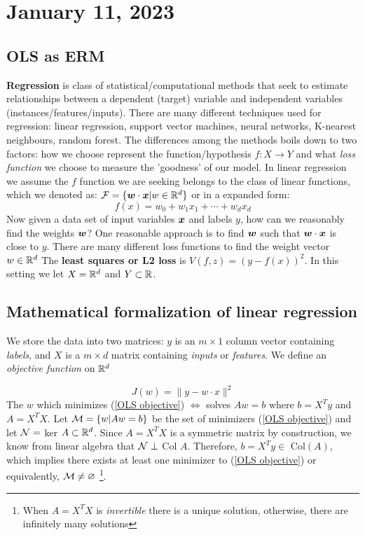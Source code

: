 \section{January 11, 2023}
\subsection{OLS as ERM}
\textbf{Regression} is class of statistical/computational methods that seek to estimate relationships between a dependent (target) variable and independent variables (instances/features/inputs).
There are many different techniques used for regression: linear regression, support vector machines, neural networks, K-nearest neighbours, random forest.
The differences among the methods boils down to two factors: how we choose represent the function/hypothesis $f: X \to Y$ and what \textit{loss function} we choose to measure the 'goodness' of our model. 
In linear regression we assume the $f$ function we are seeking belongs to the class of linear functions, which we denoted as:  $\mathcal F = \{\boldsymbol{w} \cdot \boldsymbol{x} | w \in \mathbb R^d \}$ or in a expanded form:
$$
f(x) = w_0 + w_1 x_1 + \cdots + w_d x_d
$$
Now given a data set of input variables $\boldsymbol{x}$ and labels $y$, how can we reasonably find the weights $\boldsymbol{w}$? One reasonable approach is to find $\boldsymbol{w}$ such that $\boldsymbol{w} \cdot \boldsymbol{x}$ is close to $y$.
There are many different loss functions to find the weight vector $w \in \mathbb R^d$
The \textbf{least squares or L2 loss} is $V(f,z) = (y - f(x))^2$. In this setting  we let $X = \mathbb R^d$ and $Y \subset \mathbb R$. 
\subsection{Mathematical formalization of linear regression}
We store the data into two matrices: $y$ is an $m \times 1$ column vector containing \textit{labels}, and $X$ is a $m \times d$ matrix containing \textit{inputs} or \textit{features}. We define an \textit{objective function} on $\mathbb R^d$

\begin{equation}\label{OLS objective}
    J(w) = \parallel y - w\cdot x \parallel^2
\end{equation}
The $w$ which minimizes (\ref{OLS objective}) $\Leftrightarrow$ solves $Aw = b$ where $b = X^Ty$ and $A = X^TX$. 
Let $\mathcal M = \{w|Aw =b \}$ be the set of minimizers (\ref{OLS objective}) and let 
$\mathcal N =$ ker $A \subset \mathbb R^d$. Since $A = X^TX$ is a symmetric matrix by construction, we know from linear algebra that $\mathcal N \perp$ Col $A$. Therefore,  $b = X^Ty \in $ Col$(A)$, which implies there exists at least one minimizer to (\ref{OLS objective}) or equivalently, $\mathcal M \neq \varnothing$
\footnote{When $A = X^TX$ is \textit{invertible} there is a unique solution, otherwise, there are infinitely many solutions}.



